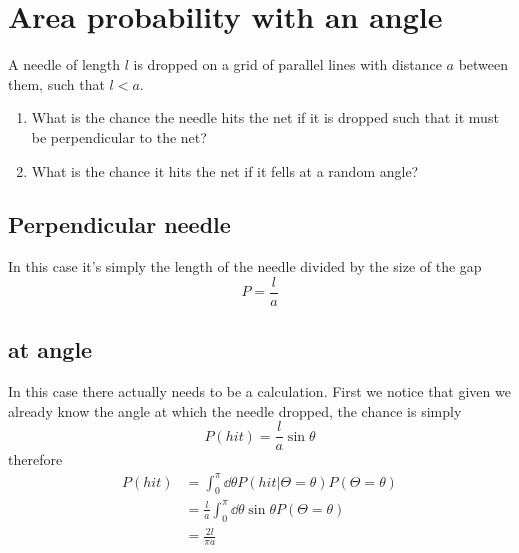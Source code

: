 \clearpage
\section{Area probability with an angle}
\begin{colbox}
	A needle of length \(l\) is dropped on a grid of parallel lines with distance \(a\) between them, such that \(l<a\).
	\begin{enumerate}
		\item What is the chance the needle hits the net if it is dropped such that it must be perpendicular to the net?
		\item What is the chance it hits the net if it fells at a random angle?
	\end{enumerate}
\end{colbox}
\subsection{Perpendicular needle}
In this case it's simply the length of the needle divided by the size of the gap
\begin{equation}
	P=\frac{l}{a}
\end{equation}
\subsection{at angle}
In this case there actually needs to be a calculation. First we notice that given we already know the angle at which the needle dropped, the chance is simply
\begin{equation}
	P(hit) = \frac{l}{a}\sin\theta
\end{equation}
therefore
\begin{align}
	P(hit) &= \int_{0}^{\pi}\dd{\theta}P(hit|\Theta=\theta)P(\Theta=\theta)\\
	&= \frac{l}{a}\int_{0}^{\pi}\dd{\theta}\sin\theta P(\Theta=\theta)\\
	&= \frac{2l}{\pi a}
\end{align}